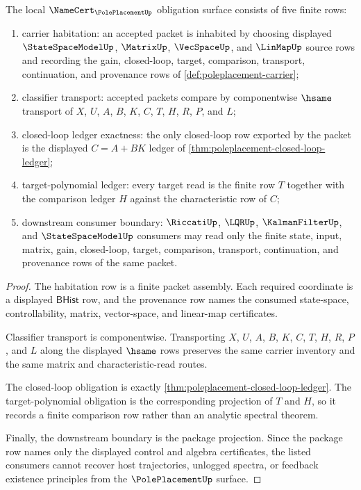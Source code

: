 \begin{theorem}
\label{thm:poleplacement-namecert-obligations}
The local $\NameCert_{\PolePlacementUp}$ obligation surface consists of five
finite rows:
\begin{enumerate}
\item carrier habitation: an accepted packet is inhabited by choosing displayed
$\StateSpaceModelUp$, $\MatrixUp$, $\VecSpaceUp$, and $\LinMapUp$ source rows
and recording the gain, closed-loop, target, comparison, transport,
continuation, and provenance rows of \autoref{def:poleplacement-carrier};
\item classifier transport: accepted packets compare by componentwise $\hsame$
transport of $X$, $U$, $A$, $B$, $K$, $C$, $T$, $H$, $R$, $P$, and $L$;
\item closed-loop ledger exactness: the only closed-loop row exported by the
packet is the displayed $C=A+BK$ ledger of
\autoref{thm:poleplacement-closed-loop-ledger};
\item target-polynomial ledger: every target read is the finite row $T$
together with the comparison ledger $H$ against the characteristic row of $C$;
\item downstream consumer boundary: $\RiccatiUp$, $\LQRUp$,
$\KalmanFilterUp$, and $\StateSpaceModelUp$ consumers may read only the finite
state, input, matrix, gain, closed-loop, target, comparison, transport,
continuation, and provenance rows of the same packet.
\end{enumerate}
\end{theorem}
\begin{proof}
The habitation row is a finite packet assembly. Each required coordinate is a
displayed $\mathsf{BHist}$ row, and the provenance row names the consumed
state-space, controllability, matrix, vector-space, and linear-map
certificates.

Classifier transport is componentwise. Transporting $X$, $U$, $A$, $B$, $K$,
$C$, $T$, $H$, $R$, $P$, and $L$ along the displayed $\hsame$ rows preserves
the same carrier inventory and the same matrix and characteristic-read routes.

The closed-loop obligation is exactly
\autoref{thm:poleplacement-closed-loop-ledger}. The target-polynomial
obligation is the corresponding projection of $T$ and $H$, so it records a
finite comparison row rather than an analytic spectral theorem.

Finally, the downstream boundary is the package projection. Since the package
row names only the displayed control and algebra certificates, the listed
consumers cannot recover host trajectories, unlogged spectra, or feedback
existence principles from the $\PolePlacementUp$ surface.
\end{proof}


